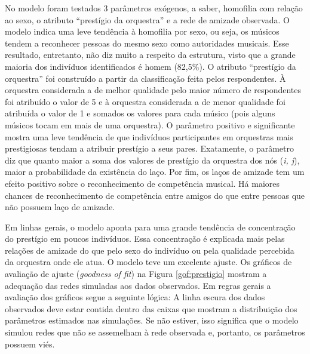 \documentclass[a4paper, 12pt, openright, oneside, german, french, english, brazil]{abntex2}
\begin{document}
	No modelo foram testados 3 parâmetros exógenos, a saber, homofilia com relação ao sexo, o atributo ``prestígio da orquestra'' e a rede de amizade observada. O modelo indica uma leve tendência à homofilia por sexo, ou seja, os músicos tendem a reconhecer pessoas do mesmo sexo como autoridades musicais. Esse resultado, entretanto, não diz muito a respeito da estrutura, visto que a grande maioria dos indivíduos identificados é homem (82,5\%).	O atributo ``prestígio da orquestra'' foi construído a partir da classificação feita pelos respondentes. À orquestra considerada a de melhor qualidade pelo maior número de respondentes foi atribuído o valor de 5 e à orquestra considerada a de menor qualidade foi atribuída o valor de 1 e somados os valores para cada músico (pois alguns músicos tocam em mais de uma orquestra). O parâmetro positivo e significante mostra uma leve tendência de que indivíduos participantes em orquestras mais prestigiosas tendam a atribuir prestígio a seus pares. Exatamente, o parâmetro diz que quanto maior a soma dos valores de prestígio da orquestra dos nós (\textit{i, j}), maior a probabilidade da existência do laço. Por fim, os laços de amizade tem um efeito positivo sobre o reconhecimento de competência musical. Há maiores chances de reconhecimento de competência entre amigos do que entre pessoas que não possuem laço de amizade.
	
	Em linhas gerais, o modelo aponta para uma grande tendência de concentração do prestígio em poucos indivíduos. Essa concentração é explicada mais pelas relações de amizade do que pelo sexo do indivíduo ou pela qualidade percebida da orquestra onde ele atua. O modelo teve um excelente ajuste. Os gráficos de avaliação de ajuste (\textit{goodness of fit}) na Figura \ref{gof:prestigio} mostram a adequação das redes simuladas aos dados observados. Em regras gerais a avaliação dos gráficos segue a seguinte lógica: A linha escura dos dados observados deve estar contida dentro das caixas que mostram a distribuição dos parâmetros estimados nas simulações. Se não estiver, isso significa que o modelo simulou redes que não se assemelham à rede observada e, portanto, os parâmetros possuem viés.
	
\end{document}
